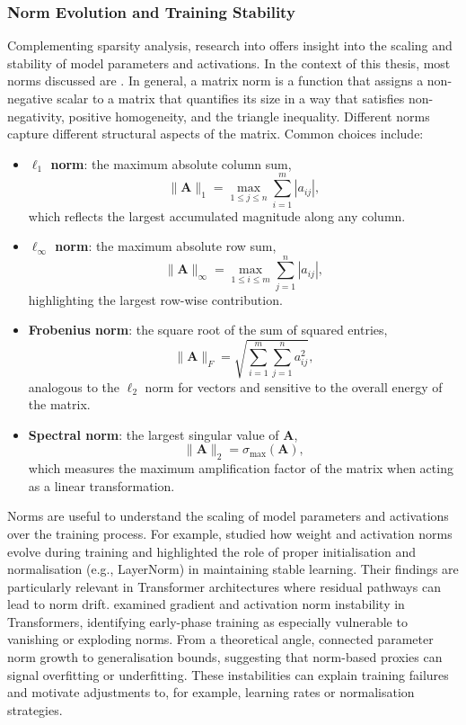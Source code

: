\subsubsection{Norm Evolution and Training Stability}

Complementing sparsity analysis, research into  offers insight into the scaling and stability of model parameters and activations. In the context of this thesis, most norms discussed are . In general, a matrix norm is a function that assigns a non-negative scalar to a matrix that quantifies its size in a way that satisfies non-negativity, positive homogeneity, and the triangle inequality. Different norms capture different structural aspects of the matrix. Common choices include:

\begin{itemize}
    \item \textbf{$\ell_1$ norm}: the maximum absolute column sum,
    \[
    \|\mathbf{A}\|_1 = \max_{1 \leq j \leq n} \sum_{i=1}^m |a_{ij}|,
    \]
    which reflects the largest accumulated magnitude along any column.
    \item \textbf{$\ell_\infty$ norm}: the maximum absolute row sum,
    \[
    \|\mathbf{A}\|_\infty = \max_{1 \leq i \leq m} \sum_{j=1}^n |a_{ij}|,
    \]
    highlighting the largest row-wise contribution.
    \item \textbf{Frobenius norm}: the square root of the sum of squared entries,
    \[
    \|\mathbf{A}\|_F = \sqrt{\sum_{i=1}^m \sum_{j=1}^n a_{ij}^2},
    \]
    analogous to the $\ell_2$ norm for vectors and sensitive to the overall energy of the matrix.
    \item \textbf{Spectral norm}: the largest singular value of $\mathbf{A}$,
    \[
    \|\mathbf{A}\|_2 = \sigma_{\max}(\mathbf{A}),
    \]
    which measures the maximum amplification factor of the matrix when acting as a linear transformation.
\end{itemize}

Norms are useful to understand the scaling of model parameters and activations over the training process. For example, \citet{mishkin2016goodinit} studied how weight and activation norms evolve during training and highlighted the role of proper initialisation and normalisation (e.g., LayerNorm) in maintaining stable learning. Their findings are particularly relevant in Transformer architectures where residual pathways can lead to norm drift. \citet{liu2020understanding} examined gradient and activation norm instability in Transformers, identifying early-phase training as especially vulnerable to vanishing or exploding norms. From a theoretical angle, \citet{arora2018theoretical} connected parameter norm growth to generalisation bounds, suggesting that norm-based proxies can signal overfitting or underfitting. These instabilities can explain training failures and motivate adjustments to, for example, learning rates or normalisation strategies. 

